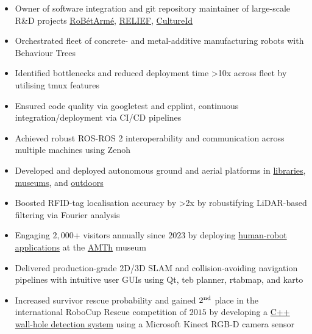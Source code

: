 \documentclass[a4paper,10pt,twoside]{article}
\begin{document}
\begin{gg_box} \small
  \begin{minipage}[t]{\textwidth}\noindent
    \begin{itemize}
      \item Owner of software integration and git repository maintainer of large-scale R\&D projects \href{https://www.robetarme-project.eu/sobre/}{RoBétArmé}, \href{https://relief.web.auth.gr/language/en/home/}{RELIEF}, \href{https://cultureid.web.auth.gr/?page\_id=200&lang=en}{CultureId}\verticalspaceafteritem
      \item Orchestrated fleet of concrete- and metal-additive manufacturing robots with Behaviour Trees\verticalspaceafteritem
      \item Identified bottlenecks and reduced deployment time >10x across fleet by utilising tmux features \verticalspaceafteritem
      \item Ensured code quality via googletest and cpplint, continuous integration/deployment via CI/CD pipelines\verticalspaceafteritem
      \item Achieved robust ROS-ROS 2 interoperability and communication across multiple machines using Zenoh\verticalspaceafteritem
      \item Developed and deployed autonomous ground and aerial platforms in \href{https://www.youtube.com/watch?v=bo4lMI640DY}{libraries}, \href{https://youtu.be/2EvTGNOqTrs?t=17}{museums}, and \href{https://www.youtube.com/watch?v=0YFQzpWgEd4}{outdoors}\verticalspaceafteritem
      \item Boosted RFID-tag localisation accuracy by >2x by robustifying LiDAR-based filtering via Fourier analysis\verticalspaceafteritem
      \item Engaging $2,000$+ visitors annually since $2023$ by deploying \href{https://www.youtube.com/watch?v=mrTL3Gep7Xk&t=36s}{human-robot applications} at the \href{https://www.amth.gr/en}{AMTh} museum\verticalspaceafteritem
      \item Delivered production-grade 2D/3D SLAM and collision-avoiding navigation pipelines with intuitive user GUIs using Qt, teb planner, rtabmap, and karto\verticalspaceafteritem
      \item Increased survivor rescue probability and gained $2^{\textnormal{nd}}$ place in the international RoboCup Rescue competition of $2015$ by developing a \href{https://github.com/li9i/pandora\_vision\_2014}{C++ wall-hole detection system} using a Microsoft Kinect RGB-D camera sensor
    \end{itemize}
  \end{minipage}
\end{gg_box}
\end{document}
